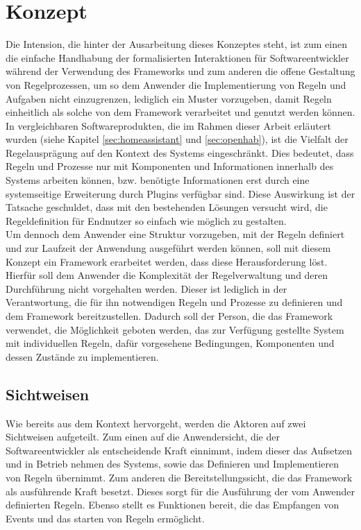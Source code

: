 \section{Konzept}
\label{sec:concept}
    Die Intension, die hinter der Ausarbeitung dieses Konzeptes steht, ist zum einen die einfache Handhabung der 
    formalisierten Interaktionen für Softwareentwickler während der Verwendung des Frameworks und zum anderen die 
    offene Gestaltung von Regelprozessen, um so dem Anwender die Implementierung von Regeln und Aufgaben nicht 
    einzugrenzen, lediglich ein Muster vorzugeben, damit Regeln einheitlich als solche von dem Framework 
    verarbeitet und genutzt werden können. 
    \\ 
    \linebreak
    In vergleichbaren Softwareprodukten, die im Rahmen dieser Arbeit erläutert 
    wurden (siehe Kapitel \ref{sec:homeassistant} und \ref{sec:openhab}), ist die Vielfalt der Regelausprägung auf 
    den Kontext des Systems eingeschränkt. Dies bedeutet, dass 
    Regeln und Prozesse nur mit Komponenten und Informationen innerhalb des Systems arbeiten können, bzw. benötigte 
    Informationen erst durch eine systemseitige Erweiterung durch Plugins verfügbar sind. Diese Auswirkung ist der 
    Tatsache geschuldet, dass mit den bestehenden Lösungen versucht wird, die Regeldefinition für Endnutzer so 
    einfach wie möglich zu gestalten. 
    \\
    \linebreak
    Um dennoch dem Anwender eine Struktur vorzugeben, mit der Regeln definiert und zur Laufzeit der Anwendung ausgeführt 
    werden können, soll mit diesem Konzept ein Framework erarbeitet werden, dass diese Herausforderung löst. Hierfür soll 
    dem Anwender die Komplexität der Regelverwaltung und deren Durchführung nicht vorgehalten werden. Dieser ist lediglich 
    in der Verantwortung, die für ihn notwendigen Regeln und Prozesse zu definieren und dem Framework bereitzustellen. 
    Dadurch soll der Person, die das Framework verwendet, die Möglichkeit geboten werden, das zur Verfügung gestellte System 
    mit individuellen Regeln, dafür vorgesehene Bedingungen, Komponenten und dessen Zustände zu implementieren.

    \subsection{Sichtweisen}
    \label{subsec:sichtweisen}
        Wie bereits aus dem Kontext hervorgeht, werden die Aktoren auf zwei Sichtweisen aufgeteilt. Zum einen auf die 
        Anwendersicht, die der Softwareentwickler als entscheidende Kraft einnimmt, indem dieser das Aufsetzen und in 
        Betrieb nehmen des Systems, sowie das Definieren und Implementieren von Regeln übernimmt. Zum anderen die 
        Bereitstellungssicht, die das Framework als ausführende Kraft besetzt. Dieses sorgt für die Ausführung der vom 
        Anwender definierten Regeln. Ebenso stellt es Funktionen bereit, die das Empfangen von Events und das starten 
        von Regeln ermöglicht. %

